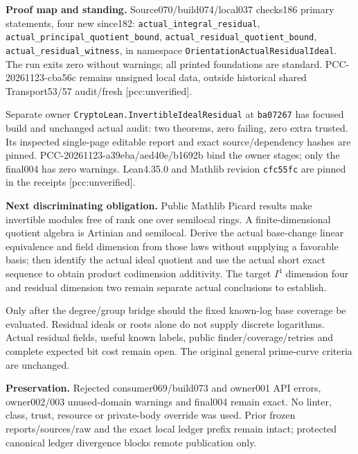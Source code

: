 \documentclass[11pt]{article}
\begin{document}
\textbf{Proof map and standing.}
Source070/build074/local037 checks186 primary statements, four new since182:
\texttt{actual\_integral\_residual},
\texttt{actual\_principal\_quotient\_bound},
\texttt{actual\_residual\_quotient\_bound},
\texttt{actual\_residual\_witness},
in namespace \texttt{OrientationActualResidualIdeal}.
The run exits zero without warnings; all printed foundations are standard.
PCC-20261123-cba56c remains unsigned local data, outside historical shared
Transport53/57 audit/fresh [pcc:unverified].

Separate owner \texttt{CryptoLean.InvertibleIdealResidual} at
\texttt{ba07267} has focused build and unchanged actual audit:
two theorems, zero failing, zero extra trusted.
Its inspected single-page editable report and exact source/dependency hashes
are pinned. PCC-20261123-a39eba/aed40e/b1692b bind the owner stages;
only the final004 has zero warnings. Lean4.35.0 and Mathlib revision
\texttt{cfc55fc} are pinned in the receipts [pcc:unverified].

\textbf{Next discriminating obligation.}
Public Mathlib Picard results make invertible modules free of rank one over
semilocal rings. A finite-dimensional quotient algebra is Artinian and
semilocal. Derive the actual base-change linear equivalence and field dimension
from those laws without supplying a favorable basis; then identify the actual
ideal quotient and use the actual short exact sequence to obtain product
codimension additivity. The target \(I^4\) dimension four and residual dimension
two remain separate actual conclusions to establish.

Only after the degree/group bridge should the fixed known-log base coverage
be evaluated. Residual ideals or roots alone do not supply discrete logarithms.
Actual residual fields, useful known labels, public finder/coverage/retries and
complete expected bit cost remain open. The original general prime-curve
criteria are unchanged.

\textbf{Preservation.}
Rejected consumer069/build073 and owner001 API errors, owner002/003
unused-domain warnings and final004 remain exact. No linter, class, trust,
resource or private-body override was used. Prior frozen reports/sources/raw
and the exact local ledger prefix remain intact; protected canonical ledger
divergence blocks remote publication only.
\end{document}
